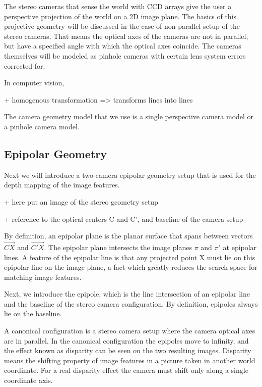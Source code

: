 \documentclass[12pt,a4paper,oneside,pdftex]{report}
\begin{document}
{The stereo cameras that sense the world with CCD arrays give the user a perspective projection of the world on a 2D image plane. The basics of this projective geometry will be discussed in the case of non-parallel setup of the stereo cameras. That means the optical axes of the cameras are not in parallel, but have a specified angle with which the optical axes coincide. The cameras themselves will be modeled as pinhole cameras with certain lens system errors corrected for.

In computer vision, 

+ homogenous transformation => transforms lines into lines



The camera geometry model that we use is a single perspective camera model or a pinhole camera model.



\subsection{Epipolar Geometry}
\label{subsection:epipolar_geometry}

Next we will introduce a two-camera epipolar geometry setup that is used for the depth mapping of the image features.

+ here put an image of the stereo geometry setup

+ reference to the optical centers C and C', and baseline of the camera setup

By definition, an epipolar plane is the planar surface that spans between vectors $\vec{CX}$ and $\vec{C'X}$. The epipolar plane intersects the image planes $\pi$ and $\pi'$ at epipolar lines. A feature of the epipolar line is that any projected point X must lie on this epipolar line on the image plane, a fact which greatly reduces the search space for matching image features.

Next, we introduce the epipole, which is the line intersection of an epipolar line and the baseline of the stereo camera configuration. By definition, epipoles always lie on the baseline.

A canonical configuration is a stereo camera setup where the camera optical axes are in parallel. In the canonical configuration the epipoles move to infinity, and the effect known as disparity can be seen on the two resulting images. Disparity means the shifting property of image features in a picture taken in another world coordinate. For a real disparity effect the camera must shift only along a single coordinate axis.

}
\end{document}
